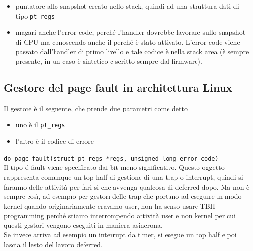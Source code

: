\documentclass[12pt, oneside]{extbook}
\begin{document}
\begin{itemize}
\item puntatore allo snapshot creato nello stack, quindi ad una struttura dati di tipo \texttt{pt\_regs}
\item magari anche l'error code, perché l'handler dovrebbe lavorare sullo snapshot di CPU ma conoscendo anche il perché è stato attivato. L'error code viene passato dall'handler di primo livello e tale codice è nella stack area (è sempre presente, in un caso è sintetico e scritto sempre dal firmware).
\end{itemize}
\subsection{Gestore del page fault in architettura Linux}
Il gestore è il seguente, che prende due parametri come detto
\begin{itemize}
\item uno è il \texttt{pt\_regs}
\item l'altro è il codice di errore
\end{itemize}
\texttt{do\_page\_fault(struct pt\_regs *regs, unsigned long error\_code)}\\Il tipo d fault viene specificato dai bit meno significativo. Questo oggetto rappresenta comunque un top half di gestione di una trap o interrupt, quindi si faranno delle attività per fari si che avvenga qualcosa di deferred dopo. Ma non è sempre così, ad esempio per gestori delle trap che portano ad eseguire in modo kernel quando originariamente eravamo user, non ha senso usare TBH programming perché stiamo interrompendo attività user e non kernel per cui questi gestori vengono eseguiti in maniera asincrona.\\Se invece arriva ad esempio un interrupt da timer, si esegue un top half e poi lascia il lesto del lavoro deferred.
\end{document}
